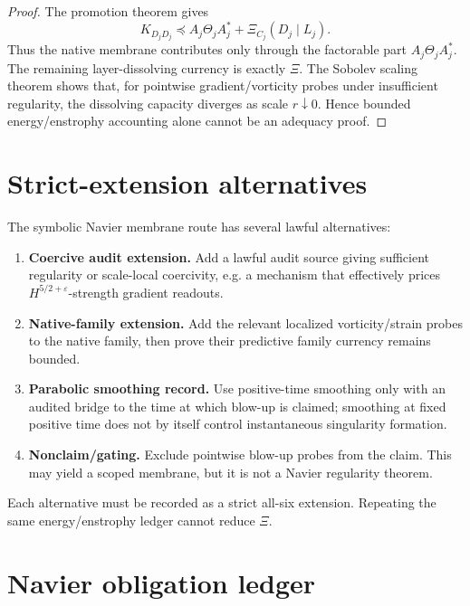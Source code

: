 \documentclass[11pt]{article}
\begin{document}
\begin{proof}
The promotion theorem gives
\[
K_{D_jD_j}\preceq A_j\Theta_jA_j^*+\Xi_{C_j}(D_j\mid L_j).
\]
Thus the native membrane contributes only through the factorable part $A_j\Theta_jA_j^*$.  The remaining layer-dissolving currency is exactly $\Xi$.  The Sobolev scaling theorem shows that, for pointwise gradient/vorticity probes under insufficient regularity, the dissolving capacity diverges as scale $r\downarrow0$.  Hence bounded energy/enstrophy accounting alone cannot be an adequacy proof.
\end{proof}

\section{Strict-extension alternatives}

The symbolic Navier membrane route has several lawful alternatives:
\begin{enumerate}[label=(\arabic*)]
\item \textbf{Coercive audit extension.} Add a lawful audit source giving sufficient regularity or scale-local coercivity, e.g. a mechanism that effectively prices $H^{5/2+\varepsilon}$-strength gradient readouts.
\item \textbf{Native-family extension.} Add the relevant localized vorticity/strain probes to the native family, then prove their predictive family currency remains bounded.
\item \textbf{Parabolic smoothing record.} Use positive-time smoothing only with an audited bridge to the time at which blow-up is claimed; smoothing at fixed positive time does not by itself control instantaneous singularity formation.
\item \textbf{Nonclaim/gating.} Exclude pointwise blow-up probes from the claim.  This may yield a scoped membrane, but it is not a Navier regularity theorem.
\end{enumerate}

Each alternative must be recorded as a strict all-six extension.  Repeating the same energy/enstrophy ledger cannot reduce $\Xi$.

\section{Navier obligation ledger}
\end{document}
